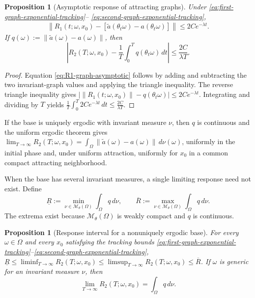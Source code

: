 \documentclass[pdflatex,sn-mathphys-num]{sn-jnl}
\numberwithin{equation}{section}
\theoremstyle{thmstyleone}%
\newtheorem{proposition}[theorem]{Proposition}
\theoremstyle{definition}
\theoremstyle{remark}
\begin{document}
\begin{proposition}[Asymptotic response of attracting graphs]
\label{prop:response-asymptotics}
Under
\eqref{eq:first-graph-exponential-tracking}--%
\eqref{eq:second-graph-exponential-tracking},
\begin{equation}
\label{eq:R1-graph-asymptotic}
\begin{split}
    \left\|
    R_1(t;\omega,x_0)
    -
    \left[
    \widetilde a(\theta_t\omega)
    -
    a(\theta_t\omega)
    \right]
    \right\|
    \leq
    2Ce^{-\lambda t}.
\end{split}
\end{equation}
If
    $q(\omega)
    :=
    \|\widetilde a(\omega)-a(\omega)\|$,
then
\[
    \left|
    R_2(T;\omega,x_0)
    -
    \frac1T
    \int_0^T q(\theta_t\omega)\,dt
    \right|
    \leq
    \frac{2C}{\lambda T}.
\]
\end{proposition}

\begin{proof}
Equation \eqref{eq:R1-graph-asymptotic} follows by adding and subtracting the two invariant-graph values and applying the triangle inequality. The reverse triangle inequality gives
    $\left|
    \|R_1(t;\omega,x_0)\|
    -
    q(\theta_t\omega)
    \right|
    \leq
    2Ce^{-\lambda t}$.
Integrating and dividing by $T$ yields
    $\frac1T
    \int_0^T2Ce^{-\lambda t}\,dt
    \leq
    \frac{2C}{\lambda T}$.
\end{proof}

If the base is uniquely ergodic with invariant measure $\nu$, then $q$ is continuous and the uniform ergodic theorem gives $\lim_{T\to\infty} R_2(T;\omega,x_0) = \int_\Omega \|\widetilde a(\omega)-a(\omega)\|\,d\nu(\omega)$, uniformly in the initial phase and, under uniform attraction, uniformly for $x_0$ in a common compact attracting neighborhood.

When the base has several invariant measures, a single limiting response need not exist. Define
\begin{equation*}
    \underline R
    :=
    \min_{\nu\in\mathcal M_\theta(\Omega)}
    \int_\Omega q\,d\nu,\qquad
    \overline R
    :=
    \max_{\nu\in\mathcal M_\theta(\Omega)}
    \int_\Omega q\,d\nu.
\end{equation*}
The extrema exist because $\mathcal M_\theta(\Omega)$ is weakly compact and $q$ is continuous.

\begin{proposition}[Response interval for a nonuniquely ergodic base]
\label{prop:response-invariant-measure-interval}
For every $\omega\in\Omega$ and every $x_0$ satisfying the tracking bounds
\eqref{eq:first-graph-exponential-tracking}--\eqref{eq:second-graph-exponential-tracking},
    $\underline R
    \leq
    \liminf_{T\to\infty}
    R_2(T;\omega,x_0)
    \leq
    \limsup_{T\to\infty}
    R_2(T;\omega,x_0)
    \leq
    \overline R$.
If $\omega$ is generic for an invariant measure $\nu$, then
\begin{equation}
\label{eq:R2-generic-measure-limit}
    \lim_{T\to\infty}
    R_2(T;\omega,x_0)
    =
    \int_\Omega q\,d\nu.
\end{equation}
\end{proposition}
\end{document}
